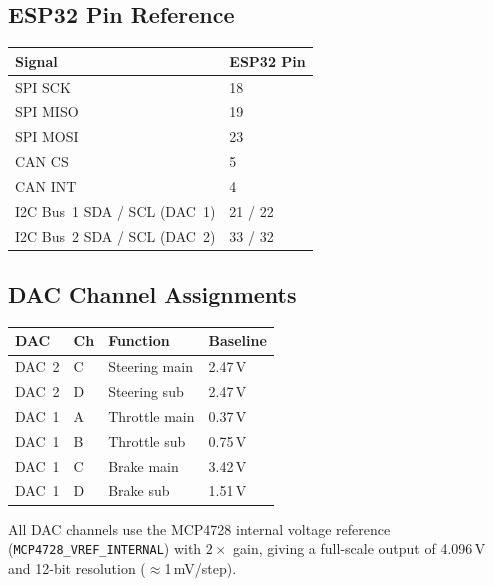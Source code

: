 ﻿\documentclass[12pt, letterpaper]{article}
\begin{document}
\subsection{ESP32 Pin Reference}

\begin{center}
\begin{tabular}{ll}
  \toprule
  \textbf{Signal} & \textbf{ESP32 Pin}\\
  \midrule
  SPI SCK  & 18\\
  SPI MISO & 19\\
  SPI MOSI & 23\\
  CAN CS   & 5\\
  CAN INT  & 4\\
  I2C Bus~1 SDA / SCL (DAC~1) & 21 / 22\\
  I2C Bus~2 SDA / SCL (DAC~2) & 33 / 32\\
  \bottomrule
\end{tabular}
\end{center}

\subsection{DAC Channel Assignments}

\begin{center}
\begin{tabular}{llll}
  \toprule
  \textbf{DAC} & \textbf{Ch} & \textbf{Function} & \textbf{Baseline}\\
  \midrule
  DAC~2 & C & Steering main & 2.47\,V\\
  DAC~2 & D & Steering sub  & 2.47\,V\\
  DAC~1 & A & Throttle main & 0.37\,V\\
  DAC~1 & B & Throttle sub  & 0.75\,V\\
  DAC~1 & C & Brake main    & 3.42\,V\\
  DAC~1 & D & Brake sub     & 1.51\,V\\
  \bottomrule
\end{tabular}
\end{center}

\begin{notebox}
All DAC channels use the MCP4728 internal voltage reference
(\texttt{MCP4728\_VREF\_INTERNAL}) with $2\times$ gain, giving a full-scale output of
4.096\,V and 12-bit resolution ($\approx$1\,mV/step).
\end{notebox}

\end{document}
